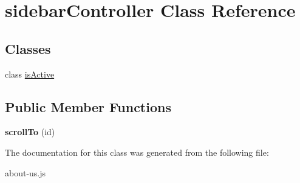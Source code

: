 \hypertarget{classsidebarController}{\section{sidebar\-Controller Class Reference}
\label{classsidebarController}
}
\subsection*{Classes}
\begin{DoxyCompactItemize}
\item 
class \hyperlink{classsidebarController_1_1isActive}{is\-Active}
\end{DoxyCompactItemize}
\subsection*{Public Member Functions}
\begin{DoxyCompactItemize}
\item 
\hypertarget{classsidebarController_ac4c20892be4e8ce7c58f3df27f3340da}{{\bfseries scroll\-To} (id)}\label{classsidebarController_ac4c20892be4e8ce7c58f3df27f3340da}

\end{DoxyCompactItemize}


The documentation for this class was generated from the following file\-:\begin{DoxyCompactItemize}
\item 
about-\/us.\-js\end{DoxyCompactItemize}
